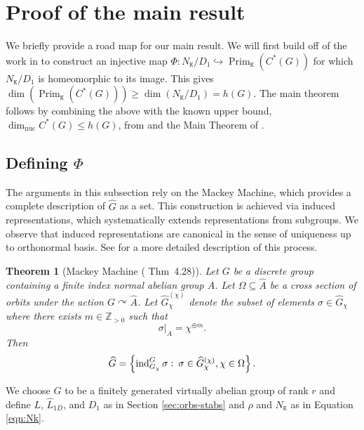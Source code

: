 \documentclass[11pt, twoside]{amsart}
\newcommand{\te}[1]{\operatorname{#1}}
\newcommand{\zn}{\mathbb{Z}}
\newcommand{\Prim}{\operatorname{Prim}}
\newcommand{\sse}{\subseteq}
\newcommand{\mt}{\mathtt}
\newcommand{\wh}{\widehat}
\renewcommand{\l}{\left}
\renewcommand{\r}{\right}
\newcommand{\dimnuc }{\dim_{\operatorname{nuc}}}
\newtheorem{thm}{Theorem}[section]
\theoremstyle{definition}
\newcommand{\str}{\texorpdfstring}
\begin{document}
\section{Proof of the main result}\label{sec:lower_bound}

We briefly provide a road map for our main result. We will first build off of the work in \cite{KanTay13,Mac58} to construct an injective map $\Phi: N_{\mt{K}}/D_1 \hookrightarrow \Prim_{\mt{K}}(C^*(G))$ for which $N_{\mt{K}}/D_1$ is homeomorphic to its image. This gives $\dim(\Prim_{\mt{K}}(C^*(G)))\geq \dim(N_{\mt{K}}/D_1)=h(G)$. The main theorem follows by combining the above with the known upper bound, $\dimnuc C^*(G)\leq h(G)$, from \cite[Prop. 2.14]{BL24} and the Main Theorem of \cite{Win04}.

\subsection{Defining \str{$\Phi$}{Phi}}

The arguments in this subsection rely on the Mackey Machine, which provides a complete description of $\wh{G}$ as a set. This construction is achieved via induced representations, which systematically extends representations from subgroups. We observe that induced representations are canonical in the sense of uniqueness up to orthonormal basis. See \cite[Ch 2]{KanTay13} for a more detailed description of this process.

\begin{thm}[Mackey Machine (\cite{KanTay13} Thm~4.28)]\label{thm:Mackey_machine}
Let $G$ be a discrete group containing a finite index normal abelian group $A$. Let
$\Omega\sse\wh{A}$ be a cross section of orbits under the action $G\curvearrowright \wh{A}$. Let $\wh{G}_{\chi}^{(\chi)}$ denote the subset of elements $\sigma\in\wh{G}_{\chi}$ where there exists $m\in\zn_{>0}$ such that
\begin{equation}\label{eqn:block_diag_restriction}
\sigma\big|_{A}=\chi^{\oplus m}.
\end{equation}
    Then 
    \[\wh{G}=\l\{\te{\normalfont{ind}}_{G_{\chi}}^G\sigma\,\colon\,\sigma\in \wh{G}_{\chi}^{(\chi)},\chi\in\Omega\r\}.\]
\end{thm}

We choose $G$ to be a finitely generated virtually abelian group of rank $r$ and define $L$, $\wh{L}_{1D}$, and $D_1$ as in Section \ref{sec:orbs-stabs} and $\rho$ and $N_{\mt{K}}$ as in Equation \ref{eqn:Nk}.
\end{document}
